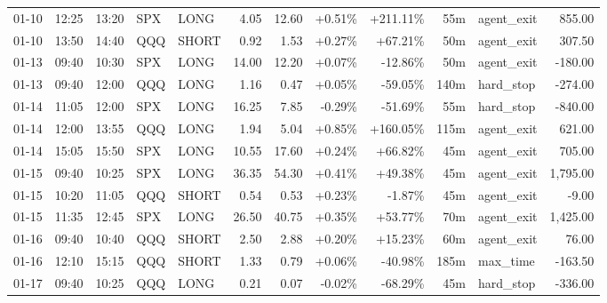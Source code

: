 \documentclass[11pt,a4paper,twoside]{article}
\begin{document}
\begin{center}
\begin{longtable}{>{\color{txtmain}}l l l l l r r r r r >{\color{txtmain}}l r}
01-10 & 12:25 & 13:20 & SPX & LONG & 4.05 & 12.60 & \textcolor{wingreen}{+0.51\%} & \textcolor{wingreen}{+211.11\%} & 55m & agent\_exit & \textcolor{wingreen}{855.00} \\
01-10 & 13:50 & 14:40 & QQQ & SHORT & 0.92 & 1.53 & \textcolor{wingreen}{+0.27\%} & \textcolor{wingreen}{+67.21\%} & 50m & agent\_exit & \textcolor{wingreen}{307.50} \\
01-13 & 09:40 & 10:30 & SPX & LONG & 14.00 & 12.20 & \textcolor{wingreen}{+0.07\%} & \textcolor{lossred}{-12.86\%} & 50m & agent\_exit & \textcolor{lossred}{-180.00} \\
01-13 & 09:40 & 12:00 & QQQ & LONG & 1.16 & 0.47 & \textcolor{wingreen}{+0.05\%} & \textcolor{lossred}{-59.05\%} & 140m & hard\_stop & \textcolor{lossred}{-274.00} \\
01-14 & 11:05 & 12:00 & SPX & LONG & 16.25 & 7.85 & \textcolor{lossred}{-0.29\%} & \textcolor{lossred}{-51.69\%} & 55m & hard\_stop & \textcolor{lossred}{-840.00} \\
01-14 & 12:00 & 13:55 & QQQ & LONG & 1.94 & 5.04 & \textcolor{wingreen}{+0.85\%} & \textcolor{wingreen}{+160.05\%} & 115m & agent\_exit & \textcolor{wingreen}{621.00} \\
01-14 & 15:05 & 15:50 & SPX & LONG & 10.55 & 17.60 & \textcolor{wingreen}{+0.24\%} & \textcolor{wingreen}{+66.82\%} & 45m & agent\_exit & \textcolor{wingreen}{705.00} \\
01-15 & 09:40 & 10:25 & SPX & LONG & 36.35 & 54.30 & \textcolor{wingreen}{+0.41\%} & \textcolor{wingreen}{+49.38\%} & 45m & agent\_exit & \textcolor{wingreen}{1,795.00} \\
01-15 & 10:20 & 11:05 & QQQ & SHORT & 0.54 & 0.53 & \textcolor{wingreen}{+0.23\%} & \textcolor{lossred}{-1.87\%} & 45m & agent\_exit & \textcolor{lossred}{-9.00} \\
01-15 & 11:35 & 12:45 & SPX & LONG & 26.50 & 40.75 & \textcolor{wingreen}{+0.35\%} & \textcolor{wingreen}{+53.77\%} & 70m & agent\_exit & \textcolor{wingreen}{1,425.00} \\
01-16 & 09:40 & 10:40 & QQQ & SHORT & 2.50 & 2.88 & \textcolor{wingreen}{+0.20\%} & \textcolor{wingreen}{+15.23\%} & 60m & agent\_exit & \textcolor{wingreen}{76.00} \\
01-16 & 12:10 & 15:15 & QQQ & SHORT & 1.33 & 0.79 & \textcolor{wingreen}{+0.06\%} & \textcolor{lossred}{-40.98\%} & 185m & max\_time & \textcolor{lossred}{-163.50} \\
01-17 & 09:40 & 10:25 & QQQ & LONG & 0.21 & 0.07 & \textcolor{lossred}{-0.02\%} & \textcolor{lossred}{-68.29\%} & 45m & hard\_stop & \textcolor{lossred}{-336.00} \\

\end{longtable}
\end{center}
\end{document}
